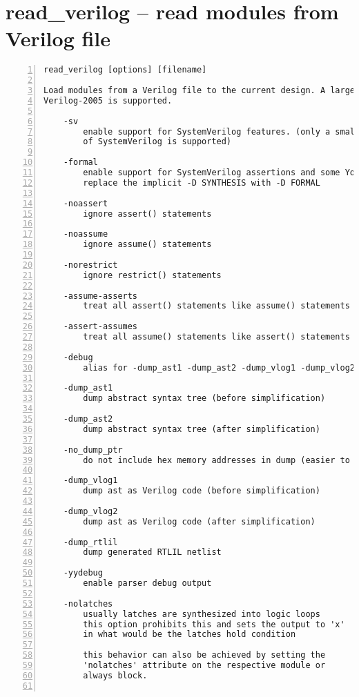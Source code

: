 \section{read\_verilog -- read modules from Verilog file}
\label{cmd:read_verilog}
\begin{lstlisting}[numbers=left,frame=single]
    read_verilog [options] [filename]

Load modules from a Verilog file to the current design. A large subset of
Verilog-2005 is supported.

    -sv
        enable support for SystemVerilog features. (only a small subset
        of SystemVerilog is supported)

    -formal
        enable support for SystemVerilog assertions and some Yosys extensions
        replace the implicit -D SYNTHESIS with -D FORMAL

    -noassert
        ignore assert() statements

    -noassume
        ignore assume() statements

    -norestrict
        ignore restrict() statements

    -assume-asserts
        treat all assert() statements like assume() statements

    -assert-assumes
        treat all assume() statements like assert() statements

    -debug
        alias for -dump_ast1 -dump_ast2 -dump_vlog1 -dump_vlog2 -yydebug

    -dump_ast1
        dump abstract syntax tree (before simplification)

    -dump_ast2
        dump abstract syntax tree (after simplification)

    -no_dump_ptr
        do not include hex memory addresses in dump (easier to diff dumps)

    -dump_vlog1
        dump ast as Verilog code (before simplification)

    -dump_vlog2
        dump ast as Verilog code (after simplification)

    -dump_rtlil
        dump generated RTLIL netlist

    -yydebug
        enable parser debug output

    -nolatches
        usually latches are synthesized into logic loops
        this option prohibits this and sets the output to 'x'
        in what would be the latches hold condition

        this behavior can also be achieved by setting the
        'nolatches' attribute on the respective module or
        always block.


\end{lstlisting}
